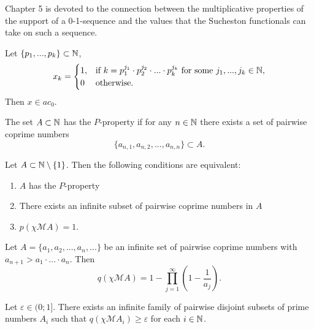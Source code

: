 Chapter 5 is devoted to the connection between the multiplicative properties of the support of a 0-1-sequence
and the values that the Sucheston functionals can take on such a sequence.

	Let $\{p_1, ..., p_k\} \subset \mathbb{N}$,
	\begin{equation}
		x_k = \begin{cases}
			1, &\mbox{if~} k = p_1^{j_1}\cdot p_2^{j_2}\cdot ... \cdot p_k^{j_k} \mbox{~for some~} j_1,...,j_k\in\mathbb{N},
			\\
			0  &\mbox{otherwise}.
		\end{cases}
	\end{equation}
	Then $x\in ac_0$.

	The set $A\subset\mathbb{N}$ has the $P$-property if for any $n\in\mathbb{N}$ there exists a set of pairwise coprime numbers
	\begin{equation}
		\{a_{n,1}, a_{n,2}, ..., a_{n,n}  \} \subset A
		.
	\end{equation}

	Let $A\subset \mathbb{N}\setminus\{1\}$.
	Then the following conditions are equivalent:
	\begin{enumerate}[label=(\roman*)]
		\item
			$A$ has the $P$-property
		\item
			There exists an infinite subset of pairwise coprime numbers in $A$
		\item
			$p(\chi\mathscr{M}A)=1$.
	\end{enumerate}

	Let $A = \{a_1, a_2, ..., a_n,...\}$ be an infinite set of pairwise coprime numbers
	with $a_{n+1}>a_1\cdot...\cdot a_n$.
	Then
	\begin{equation}
		q(\chi\mathscr{M}A) = 1-\prod_{j=1}^\infty \left(1-\frac{1}{a_j}\right)
		.
	\end{equation}

	Let $\varepsilon \in  (0; 1{]}$.
	There exists an infinite family of pairwise disjoint subsets of prime numbers
	$A_i$ such that $q(\chi\mathscr{M}A_i)\geq\varepsilon$ for each $i\in\mathbb{N}$.
